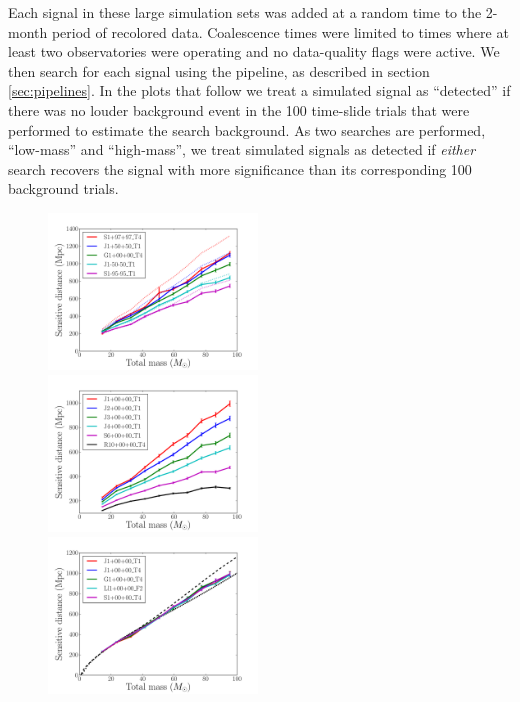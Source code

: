 Each signal in these large simulation sets was added at a random time
to the 2-month period of recolored data. Coalescence times were limited to 
times where at least two observatories were operating and no data-quality flags 
were active. We then search for each
signal using the \ihope{} pipeline, as described in section
\ref{sec:pipelines}. In the plots that follow we treat a simulated
signal as ``detected'' if there was no louder background event in the
100 time-slide trials that were performed to estimate the search
background. As two \ihope{} searches are performed, ``low-mass'' and
``high-mass'', we treat simulated signals as detected if \emph{either}
search recovers the signal with more significance than its
corresponding 100 background trials.

\begin{figure}
\centering
\includegraphics[width=0.495\textwidth]
{papers/mdc2013_submission/figure11A}
\includegraphics[width=0.495\textwidth]
{papers/mdc2013_submission/figure11B}
\includegraphics[width=0.495\textwidth]
{papers/mdc2013_submission/figure11C}

\end{figure}
